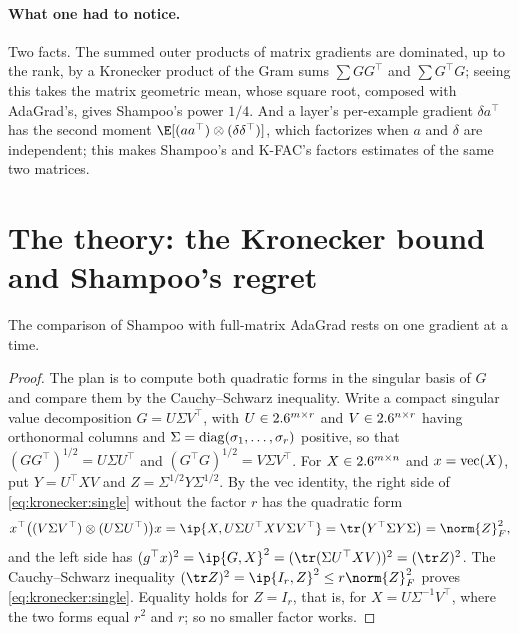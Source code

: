 \begin{refsection}
\paragraph{What one had to notice.} Two facts. The summed outer products of matrix gradients are dominated, up to the rank, by a Kronecker product of the Gram sums $\sum GG^\top$ and $\sum G^\top G$; seeing this takes the matrix geometric mean, whose square root, composed with AdaGrad's, gives Shampoo's power $1/4$. And a layer's per-example gradient $\delta a^\top$ has the second moment $\E[(aa^\top)\otimes(\delta\delta^\top)]$, which factorizes when $a$ and $\delta$ are independent; this makes Shampoo's and K-FAC's factors estimates of the same two matrices.

\section{The theory: the Kronecker bound and Shampoo's regret}\label{sec:kronecker:bound}

The comparison of Shampoo with full-matrix AdaGrad rests on one gradient at a time.


\begin{proof}
The plan is to compute both quadratic forms in the singular basis of $G$ and compare them by the Cauchy--Schwarz inequality. Write a compact singular value decomposition $G=U\Sigma V^\top$, with $U\in2.6^{m\times r}$ and $V\in2.6^{n\times r}$ having orthonormal columns and $\Sigma=\operatorname{diag}(\sigma_1,\dots,\sigma_r)$ positive, so that $(GG^\top)^{1/2}=U\Sigma U^\top$ and $(G^\top G)^{1/2}=V\Sigma V^\top$. For $X\in2.6^{m\times n}$ and $x=\operatorname{vec}(X)$, put $Y=U^\top XV$ and $Z=\Sigma^{1/2}Y\Sigma^{1/2}$. By the vec identity, the right side of \eqref{eq:kronecker:single} without the factor $r$ has the quadratic form
\[
  x^\top\bigl((V\Sigma V^\top)\otimes(U\Sigma U^\top)\bigr)x=\ip{X,U\Sigma U^\top XV\Sigma V^\top}=\tr\bigl(Y^\top\Sigma Y\Sigma\bigr)=\norm{Z}_F^2 ,
\]
and the left side has $(g^\top x)^2=\ip{G,X}^2=(\tr(\Sigma U^\top XV))^2=(\tr Z)^2$. The Cauchy--Schwarz inequality $(\tr Z)^2=\ip{I_r,Z}^2\le r\norm{Z}_F^2$ proves \eqref{eq:kronecker:single}. Equality holds for $Z=I_r$, that is, for $X=U\Sigma^{-1}V^\top$, where the two forms equal $r^2$ and $r$; so no smaller factor works.
\end{proof}


\end{refsection}
